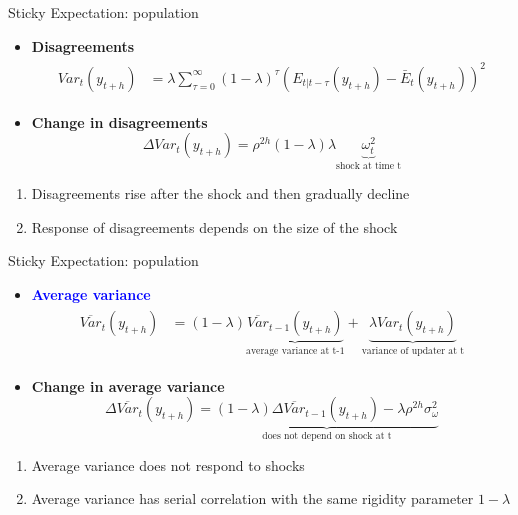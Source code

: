 \documentclass{beamer}
\begin{document}
\begin{frame}{Sticky Expectation: population}
\begin{itemize}
\item \textbf{Disagreements}
\begin{eqnarray*}
	\begin{aligned}
		Var_t(y_{t+h} ) & = \lambda \sum^{\infty}_{\tau=0} (1-\lambda)^{\tau} (E_{t|t-\tau}(y_{t+h}) - \bar E_t(y_{t+h}))^2  
	\end{aligned}
\end{eqnarray*}
\item \textbf{Change in disagreements}
$$\Delta Var_t (y_{t+h}) = \rho^{2h} (1-\lambda)\lambda \underbrace{\omega^2_t}_{\text{shock at time t}}$$
\end{itemize}

\begin{enumerate}
\item Disagreements rise after the shock and then gradually decline 
\item Response of disagreements depends on the size of the shock
\end{enumerate}
\end{frame}

\begin{frame}{Sticky Expectation: population}
\begin{itemize}
\item \textcolor{blue}{\textbf{Average variance}}
\begin{eqnarray*}
\begin{aligned}
	\overline {Var}_{t}(y_{t+h}) &  =  (1-\lambda)\underbrace{\overline {Var}_{t-1}(y_{t+h})}_{\text{average variance at t-1}} + \underbrace{\lambda Var_{t}(y_{t+h})}_{\text{variance of updater at t} }
\end{aligned}
\end{eqnarray*}
\item \textbf{Change in average variance}
$$\Delta \overline {Var}_{t}(y_{t+h}) = \underbrace{(1-\lambda)\Delta \overline {Var}_{t-1}(y_{t+h}) - \lambda \rho^{2h}\sigma^2_{\omega}}_{\text{does not depend on shock at t}}$$
\end{itemize}

\begin{enumerate}
\item Average variance does not respond to shocks
\item Average variance has serial correlation with the same rigidity parameter $1-\lambda$ 
\end{enumerate}

\end{frame}
\end{document}
